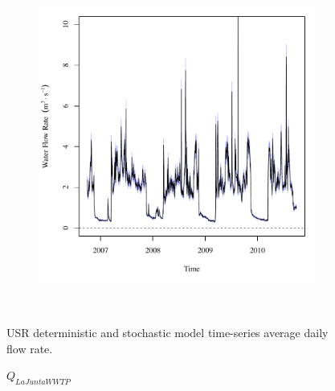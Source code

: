 \begin{linenumbers}
\begin{landscape}
\begin{figure}
\begin{subfigure}{0.7\textwidth}
		\end{subfigure}%
		\begin{subfigure}{0.7\textwidth}
			\centering
			\includegraphics[width=\tableCustomSize]{"Figures/Results_USR/Stochastic/Q TIM"}
		\end{subfigure}\\
		\caption{USR deterministic and stochastic model time-series average daily flow rate.}
	\end{figure}
\end{landscape}
\subfiguremid
\begin{landscape}
	\begin{figure}
		\centering
		$ Q_{LaJuntaWWTP} $
		\begin{subfigure}{0.7\textwidth}
			\centering

\end{subfigure}
\end{figure}
\end{landscape}
\end{linenumbers}
